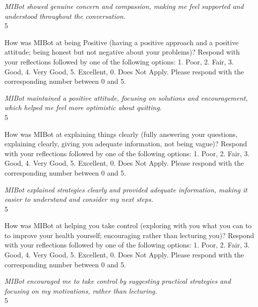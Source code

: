 \begin{clientbox}
\textit{MIBot showed genuine concern and compassion, making me feel supported and understood throughout the conversation.} \\
5
\end{clientbox}

\begin{researcherbox}
How was MIBot at being Positive (having a positive approach and a positive attitude; being honest but not negative about your problems)? Respond with your reflections followed by one of the following options: 1. Poor, 2. Fair, 3. Good, 4. Very Good, 5. Excellent, 0. Does Not Apply. Please respond with the corresponding number between 0 and 5.
\end{researcherbox}

\begin{clientbox}
\textit{MIBot maintained a positive attitude, focusing on solutions and encouragement, which helped me feel more optimistic about quitting.} \\
5
\end{clientbox}

\begin{researcherbox}
How was MIBot at explaining things clearly (fully answering your questions, explaining clearly, giving you adequate information, not being vague)? Respond with your reflections followed by one of the following options: 1. Poor, 2. Fair, 3. Good, 4. Very Good, 5. Excellent, 0. Does Not Apply. Please respond with the corresponding number between 0 and 5.
\end{researcherbox}

\begin{clientbox}
\textit{MIBot explained strategies clearly and provided adequate information, making it easier to understand and consider my next steps.} \\
5
\end{clientbox}

\begin{researcherbox}
How was MIBot at helping you take control (exploring with you what you can to to improve your health yourself; encouraging rather than lecturing you)? Respond with your reflections followed by one of the following options: 1. Poor, 2. Fair, 3. Good, 4. Very Good, 5. Excellent, 0. Does Not Apply. Please respond with the corresponding number between 0 and 5.
\end{researcherbox}

\begin{clientbox}
\textit{MIBot encouraged me to take control by suggesting practical strategies and focusing on my motivations, rather than lecturing.} \\
5
\end{clientbox}

